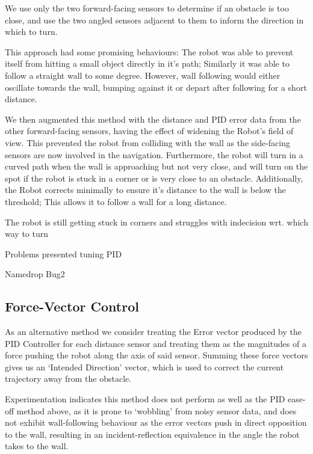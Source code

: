\documentclass[11pt, a4paper]{article}
\begin{document}
We use only the two forward-facing sensors to determine if an obstacle is too close, 
and use the two angled sensors adjacent to them to inform the direction in which to 
turn.

This approach had some promising behaviours: The robot was able to prevent itself 
from hitting a small object directly in it's path; Similarly it was able to follow 
a straight wall to some degree. However, wall following would either oscillate 
towards the wall, bumping against it or depart after following for a short distance. 


We then augmented this method with the distance and PID error data from the other
forward-facing sensors, having the effect of widening the Robot's field of view.
This prevented the robot from colliding with the wall as the side-facing sensors 
are now involved in the navigation. Furthermore, the robot will turn in a curved path
when the wall is approaching but not very close, and will turn on the spot if the 
robot is stuck in a corner or is very close to an obstacle. Additionally, the Robot 
corrects minimally to ensure it's distance to the wall is below the threshold; This 
allows it to follow a wall for a long distance.


The robot is still getting stuck in corners and struggles with indecision wrt. which way to turn

Problems presented tuning PID

Namedrop Bug2

\subsection{Force-Vector Control}

As an alternative method we consider treating the Error vector produced by the
PID Controller for each distance sensor and treating them as the magnitudes of a 
force pushing the robot along the axis of said sensor. Summing these force vectors
gives us an `Intended Direction' vector, which is used to correct the current 
trajectory away from the obstacle.

Experimentation indicates this method does not perform as well as the PID ease-off 
method above, as it is prone to `wobbling' from noisy sensor data, and does not
exhibit wall-following behaviour as the error vectors push in direct opposition to 
the wall, resulting in an incident-reflection equivalence in the angle the robot
takes to the wall.
\end{document}

